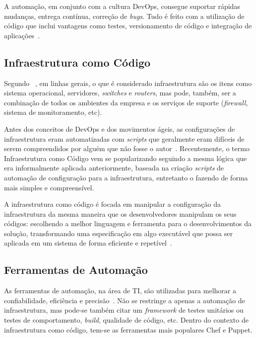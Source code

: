 A automação, em conjunto com a cultura DevOps, consegue suportar rápidas mudanças,
entrega contínua, correção de \textit{bugs}. Tudo é feito com a utilização de
código que inclui vantagens como testes, versionamento de código e
integração de aplicações~\cite{sharma:2015}.

\subsection{Infraestrutura como Código}

Segundo ~, em linhas gerais, o que é considerado
infraestrutura são os itens como sistema operacional, servidores,
\textit{switches} e \textit{routers}, mas pode, também, ser a combinação
de todos os ambientes da empresa e os serviços de suporte (\textit{firewall},
sistema de monitoramento, etc).

Antes dos conceitos de DevOps e dos movimentos ágeis, as configurações de
infraestrutura eram automatizadas com \textit{scripts} que geralmente eram
difíceis de serem compreendidos por alguém que não fosse o autor~\cite{huttermann:2012}.
Recentemente, o termo Infraestrutura como Código vem se popularizando
seguindo a mesma lógica que era informalmente aplicada anteriormente, baseada na criação
\textit{scripts} de automação de configuração para a infraestrutura, entretanto o fazendo
de forma mais simples e compreensível.

A infraestrutura como código é focada em manipular a configuração da infraestrutura
da mesma maneira que os desenvolvedores manipulam os seus códigos: escolhendo a melhor
linguagem e ferramenta para o desenvolvimentos da solução, transformando uma especificação
em algo executável que possa ser aplicada em um sistema de forma eficiente e
repetível~\cite{huttermann:2012}.


\subsection{Ferramentas de Automação}
\label{sec:ferramenta_automacao}

As ferramentas de automação, na área de TI, são utilizadas para melhorar
a confiabilidade, eficiência e precisão~\cite{sharma:2015}. Não se restringe a
apenas a automação de infraestrutura, mas pode-se também citar um \textit{framework}
de testes unitários ou testes de comportamento, \textit{build}, qualidade de código, etc.
Dentro do contexto de infraestrutura como código, tem-se as ferramentas
mais populares Chef e Puppet.


